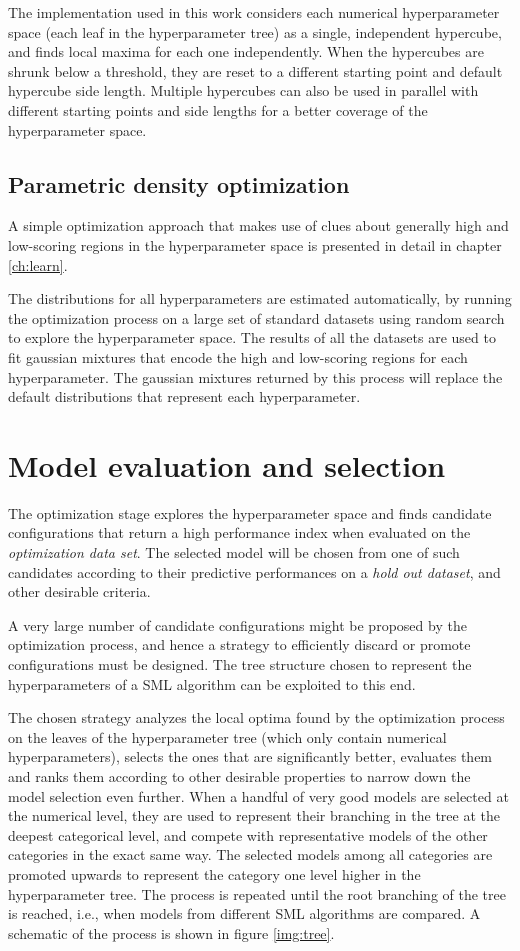 The implementation used in this work considers each numerical hyperparameter space (each leaf in the
hyperparameter tree) as a single, independent hypercube, and finds local maxima for each one
independently. When the hypercubes are shrunk below a threshold, they are reset to a different
starting point and default hypercube side length. Multiple hypercubes can also be used
in parallel with different starting points and side lengths for a better coverage of the
hyperparameter space.

\subsection{Parametric density optimization}
A simple optimization approach that makes use of clues about generally high and low-scoring regions in the
hyperparameter space is presented in detail in chapter \ref{ch:learn}.

The distributions for all hyperparameters are estimated automatically, by running the optimization
process on a large set of standard datasets using random search to explore the hyperparameter space.
The results of all the datasets are used to fit gaussian mixtures that encode the high and
low-scoring regions for each hyperparameter. The gaussian mixtures returned by this process will replace
the default distributions that represent each hyperparameter.

\section{Model evaluation and selection}
The optimization stage explores the hyperparameter space and finds candidate configurations that
return a high performance index when evaluated on the \emph{optimization data set}. The selected
model will be chosen from one of such candidates according to their predictive performances on a
\emph{hold out dataset}, and other desirable criteria.

A very large number of candidate configurations might be proposed by the optimization process, and
hence a strategy to efficiently discard or promote configurations must be designed. 
The tree structure chosen to represent the hyperparameters of a SML algorithm can be exploited to
this end.

The chosen strategy analyzes the local optima found by the optimization process on the leaves of the
hyperparameter tree (which only contain numerical hyperparameters), selects the ones that are
significantly better, evaluates them and ranks them according to other desirable properties to
narrow down the model selection even further. When a handful of very good models are selected at the
numerical level, they are used to represent their branching in the tree at the deepest categorical
level, and compete with representative models of the other categories in the exact same way. The selected
models among all categories are promoted upwards to represent the category one level higher in the
hyperparameter tree. The process is repeated until the root branching of the tree is reached, i.e.,
when models from different SML algorithms are compared. A schematic of the process is shown in
figure \ref{img:tree}.

